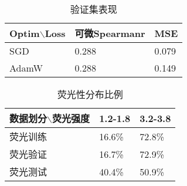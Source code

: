 
\begin{table}
    \parbox{.45\linewidth}{
    \centering
        \caption{验证集表现}
        \begin{tabular}{|l|l|l|}
        \hline
            Optim$\backslash$Loss & 可微Spearmanr & MSE \\ \hline
            SGD & 0.288 & 0.079 \\ \hline
            AdamW & 0.288 & 0.149 \\ \hline
        \end{tabular}
        \label{tab:mlp_train}
    }
    \hfill
    \parbox{.45\linewidth}{
    }
\end{table}

\begin{table}[!ht]
    \centering
    \caption{荧光性分布比例}
    \begin{tabular}{|l|l|l|}
    \hline
        数据划分$\backslash$荧光强度 & 1.2-1.8 & 3.2-3.8 \\ \hline
        荧光训练 & 16.6\% & 72.8\% \\ \hline
        荧光验证 & 16.7\% & 72.9\% \\ \hline
        荧光测试 & 40.4\% & 50.9\% \\ \hline
    \end{tabular}
    \label{tab:ratio}
\end{table}

